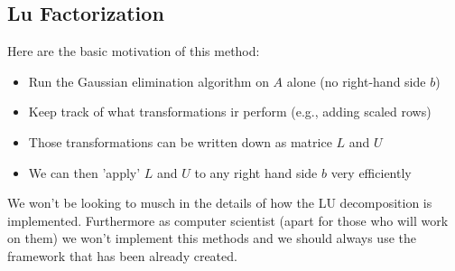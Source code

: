 \subsection{Lu Factorization}
Here are the basic motivation of this method:
\begin{itemize}
	\item Run the Gaussian elimination algorithm on $A$ alone (no right-hand side $b$)
	\item Keep track of what transformations ir perform (e.g., adding scaled rows)
	\item Those transformations can be written down as matrice $L$ and $U$
	\item We can then 'apply' $L$ and $U$ to any right hand side $b$ very efficiently
\end{itemize}
We won't be looking to musch in the details of how the LU decomposition is implemented. Furthermore as computer scientist (apart for those who will work on them) we won't implement this methods and we should always use the framework that has been already created.

